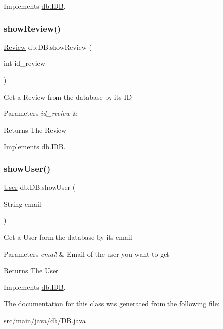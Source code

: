 Implements \hyperlink{interfacedb_1_1_i_d_b_a6418edaf7c25f99f0422c0000db521fa}{db.\+I\+DB}.

\mbox{\label{classdb_1_1_d_b_a84b36a9e2c155b1aa2868844cd157df7}} 
\subsubsection{\texorpdfstring{show\+Review()}{showReview()}}
{\footnotesize\ttfamily \hyperlink{classserver_1_1data_1_1_review}{Review} db.\+D\+B.\+show\+Review (\begin{DoxyParamCaption}\item[{int}]{id\+\_\+review }\end{DoxyParamCaption})}

Get a Review from the database by its ID 
\begin{DoxyParams}{Parameters}
{\em id\+\_\+review} & \\
\hline
\end{DoxyParams}
\begin{DoxyReturn}{Returns}
The Review 
\end{DoxyReturn}


Implements \hyperlink{interfacedb_1_1_i_d_b_a6c44c3135f07ec6dbef84ecc6fe4f90f}{db.\+I\+DB}.

\mbox{\label{classdb_1_1_d_b_a914986669ac622ef33ae344baaefa32c}} 
\subsubsection{\texorpdfstring{show\+User()}{showUser()}}
{\footnotesize\ttfamily \hyperlink{classserver_1_1data_1_1_user}{User} db.\+D\+B.\+show\+User (\begin{DoxyParamCaption}\item[{String}]{email }\end{DoxyParamCaption})}

Get a User form the database by its email 
\begin{DoxyParams}{Parameters}
{\em email} & Email of the user you want to get \\
\hline
\end{DoxyParams}
\begin{DoxyReturn}{Returns}
The User 
\end{DoxyReturn}


Implements \hyperlink{interfacedb_1_1_i_d_b_a8dca82226b1c27ceb4b765259546513d}{db.\+I\+DB}.



The documentation for this class was generated from the following file\+:\begin{DoxyCompactItemize}
\item 
src/main/java/db/\hyperlink{_d_b_8java}{D\+B.\+java}\end{DoxyCompactItemize}
